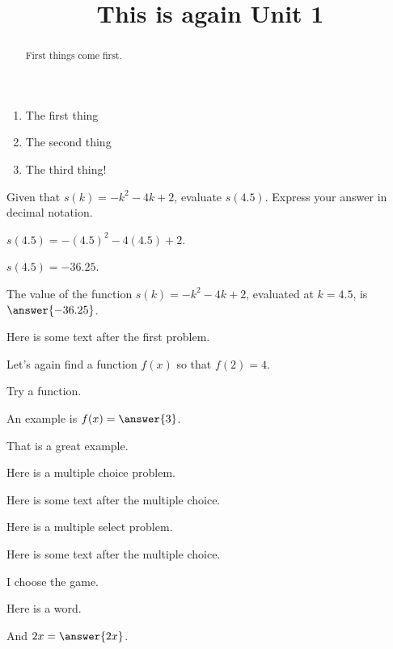 \documentclass{ximera}
\title{This is again Unit 1}
\begin{document}
\begin{abstract}
  First things come first.
\end{abstract}


\begin{enumerate}
\item The first thing
\item The second thing
\item The third thing!
\end{enumerate}

\begin{exercise}
Given that $s(k)=-k^2-4 k+2$, evaluate $s(4.5)$. Express your answer in decimal notation.
\begin{hint}
$s(4.5)=-(4.5)^2-4 (4.5)+2$.
\end{hint}
\begin{hint}
$s(4.5)=-36.25$.
\end{hint}
The value of the function $s(k)=-k^2-4 k+2$, evaluated at $k=4.5$, is $\answer{-36.25}$.

Here is some text after the first problem.
\end{exercise}


\begin{exercise}
Let's again find a function $f(x)$ so that $f(2) = 4$.

\begin{hint}
Try a function.
\end{hint}
An example is $f(x) = \answer{3}$.

That is a great example.
\end{exercise}

\begin{exercise}
  Here is a multiple choice problem.

    \begin{multipleChoice}
    \end{multipleChoice}

  Here is some text after the multiple choice.
\end{exercise}

\begin{exercise}
  Here is a multiple select problem.

    \begin{selectAll}
    \end{selectAll}

  Here is some text after the multiple choice.
\end{exercise}

\begin{exercise}
  I choose  the game.
\end{exercise}

\begin{exercise}
  Here is a  word.

  And $2x = \answer{2x}$.
\end{exercise}
\end{document}
